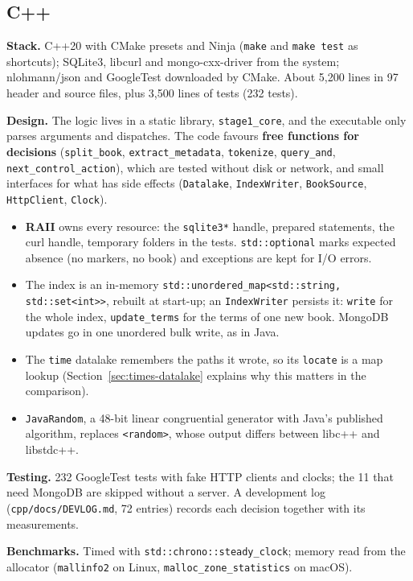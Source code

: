 \documentclass[11pt,a4paper]{article}
\newcommand{\code}[1]{\texttt{#1}}
\begin{document}
\subsection{C++}
\textbf{Stack.} C++20 with CMake presets and Ninja (\code{make} and \code{make test} as shortcuts);
SQLite3, libcurl and mongo-cxx-driver from the system; nlohmann/json and GoogleTest downloaded by
CMake. About 5,200 lines in 97 header and source files, plus 3,500 lines of tests (232 tests).

\textbf{Design.} The logic lives in a static library, \code{stage1\_core}, and the executable only
parses arguments and dispatches. The code favours \textbf{free functions for decisions}
(\code{split\_book}, \code{extract\_metadata}, \code{tokenize}, \code{query\_and},
\code{next\_control\_action}), which are tested without disk or network, and small interfaces for
what has side effects (\code{Datalake}, \code{IndexWriter}, \code{BookSource}, \code{HttpClient},
\code{Clock}).
\begin{itemize}
  \item \textbf{RAII} owns every resource: the \code{sqlite3*} handle, prepared statements, the curl
        handle, temporary folders in the tests. \code{std::optional} marks expected absence (no
        markers, no book) and exceptions are kept for I/O errors.
  \item The index is an in-memory \code{std::unordered\_map<std::string, std::set<int>>}, rebuilt
        at start-up; an \code{IndexWriter} persists it: \code{write} for the whole index,
        \code{update\_terms} for the terms of one new book. MongoDB updates go in one unordered bulk
        write, as in Java.
  \item The \code{time} datalake remembers the paths it wrote, so its \code{locate} is a map lookup
        (Section~\ref{sec:times-datalake} explains why this matters in the comparison).
  \item \code{JavaRandom}, a 48-bit linear congruential generator with Java's published algorithm,
        replaces \code{<random>}, whose output differs between libc++ and libstdc++.
\end{itemize}

\textbf{Testing.} 232 GoogleTest tests with fake HTTP clients and clocks; the 11 that need MongoDB
are skipped without a server. A development log (\code{cpp/docs/DEVLOG.md}, 72 entries) records each
decision together with its measurements.

\textbf{Benchmarks.} Timed with \code{std::chrono::steady\_clock}; memory read from the allocator
(\code{mallinfo2} on Linux, \code{malloc\_zone\_statistics} on macOS).
\end{document}
